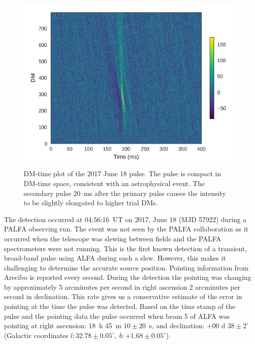 \documentclass[a4paper,fleqn,usenatbib]{mnras}
\begin{document}
\begin{figure}
    \includegraphics[width=1.0\linewidth]{figures/Beam5_fb_D20170618T005616_buffer2_dmspace.pdf}
    \caption{DM-time plot of the 2017 June 18 pulse. The pulse is compact in
    DM-time space, consistent with an astrophysical event. The secondary pulse
    20~ms after the primary pulse causes the intensity to be slightly elongated
    to higher trial DMs.
    }
    \label{fig:D20170618_dmspace}
\end{figure}

The detection occurred at 04:56:16~UT on 2017, June 18 (MJD 57922) during a
PALFA observing run. The event was not seen by the PALFA collaboration as it
occurred when the telescope was slewing between fields and the PALFA
spectrometers were not running. This is the first known detection of a
transient, broad-band pulse using ALFA during such a slew. However, this makes
it challenging to determine the accurate source position. Pointing information
from Arecibo is reported every second.  During the detection the pointing was
changing by approximately 5 arcminutes per second in right ascension 2
arcminutes per second in declination. This rate gives us a conservative estimate
of the error in pointing at the time the pulse was detected. Based on the time
stamp of the pulse and the pointing data the pulse occurred when beam 5 of ALFA
was pointing at right ascension: 18~h 45~m $10 \pm 20$~s, and declination: +00 d
$38 \pm 2$' (Galactic coordinates $l: 32.78 \pm 0.05^{\circ}, ~b: +1.68 \pm
0.05^{\circ}$).
\end{document}
